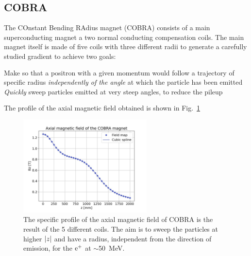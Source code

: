 \begin{refsection}
    \subsection{COBRA}
    \label{MEG:COBRA}
        The COnstant Bending RAdius magnet (COBRA) consists of a main superconducting magnet a two normal conducting compensation coils.
        The main magnet itself is made of five coils with three different radii to generate a carefully studied gradient to achieve two goals:
        \begin{outline}
            \1 Make so that a positron with a given momentum would follow a trajectory of specific radius \textit{independently of the angle} at which the particle has been emitted
            \1 \textit{Quickly} sweep particles emitted at very steep angles, to reduce the pileup
        \end{outline}
        The profile of the axial magnetic field obtained is shown in Fig.~\ref{fig:MEGII:COBRA:B}
        
        \begin{figure}
            \centering
            \includegraphics[width = 0.6\textwidth]{Figures/MEG/COBRA_B.jpeg}
            \caption{The specific profile of the axial magnetic field of COBRA is the result of the 5 different coils. The aim is to sweep the particles at higher $\abs{z}$ and have a radius, independent from the direction of emission, for the $\text{e}^+$ at $\sim$\SI{50}{MeV}.}
            \label{fig:MEGII:COBRA:B}
        \end{figure}
        

\end{refsection}

